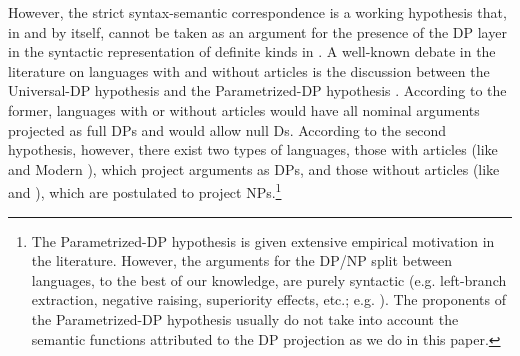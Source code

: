 \documentclass[output=paper
,modfonts
,nonflat]{langsci/langscibook}
\begin{document}
	However, the strict syntax-semantic correspondence is a working hypothesis that, in and by itself, cannot be taken as an argument for the presence of the DP layer in the syntactic representation of definite kinds in . A well-known debate in the literature on languages with and without articles is the discussion between the Universal-DP hypothesis \citep{Longobardi1994,Cinque2005,Pereltsvaig2007} and the Parametrized\hyp{}DP hypothesis \citep{Boskovic2005, Boskovic2008,Boskovic2008a,Boskovic2009}. According to the former, languages with or without articles would have all nominal arguments projected as full DPs and would allow null Ds. According to the second hypothesis, however, there exist two types of languages, those with articles (like  and Modern ), which project arguments as DPs, and those without articles (like  and ), which are postulated to project NPs.\footnote{The Parametrized-DP hypothesis is given extensive empirical motivation in the literature. However, the arguments for the DP/NP split between languages, to the best of our knowledge, are purely syntactic (e.g. left-branch extraction, negative raising, superiority effects, etc.; e.g. \citealt{Boskovic2008}). The proponents of the Parametrized-DP hypothesis usually do not take into account the semantic functions attributed to the DP projection as we do in this paper.}\largerpage 
	
\end{document}
